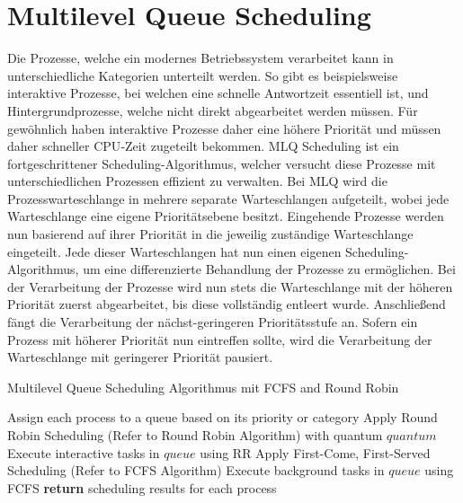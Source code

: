 
\section{Multilevel Queue Scheduling}
Die Prozesse, welche ein modernes Betriebssystem verarbeitet kann in unterschiedliche Kategorien unterteilt werden. So gibt es beispielsweise interaktive Prozesse, bei welchen eine schnelle Antwortzeit essentiell ist, und Hintergrundprozesse, welche nicht direkt abgearbeitet werden müssen. Für gewöhnlich haben interaktive Prozesse daher eine höhere Priorität und müssen daher schneller \ac{CPU}-Zeit zugeteilt bekommen. \ac{MLQ} Scheduling ist ein fortgeschrittener Scheduling-Algorithmus, welcher versucht diese Prozesse mit unterschiedlichen Prozessen effizient zu verwalten. Bei \ac{MLQ} wird die Prozesswarteschlange in mehrere separate Warteschlangen aufgeteilt, wobei jede Warteschlange eine eigene Prioritätsebene besitzt. Eingehende Prozesse werden nun basierend auf ihrer Priorität in die jeweilig zuständige Warteschlange eingeteilt. Jede dieser Warteschlangen hat nun einen eigenen Scheduling-Algorithmus, um eine differenzierte Behandlung der Prozesse zu ermöglichen. %
Bei der Verarbeitung der Prozesse wird nun stets die Warteschlange mit der höheren Priorität zuerst abgearbeitet, bis diese vollständig entleert wurde. Anschließend fängt die Verarbeitung der nächst-geringeren Prioritätsstufe an. Sofern ein Prozess mit höherer Priorität nun eintreffen sollte, wird die Verarbeitung der Warteschlange mit geringerer Priorität pausiert. 

\begin{algorithm}
	\caption{Multilevel Queue Scheduling Algorithmus mit \ac{FCFS} and Round Robin}
	\label{alg:mlq}
	\begin{algorithmic}[1]
		\State Assign each process to a queue based on its priority or category
		\State Apply Round Robin Scheduling (Refer to Round Robin Algorithm) with quantum $quantum$
		\State Execute interactive tasks in $queue$ using RR
		\State Apply First-Come, First-Served Scheduling (Refer to FCFS Algorithm)
		\State Execute background tasks in $queue$ using FCFS
		\EndIf
		\EndFor
		\State \textbf{return} scheduling results for each process
		\EndProcedure
	\end{algorithmic}
\end{algorithm}

